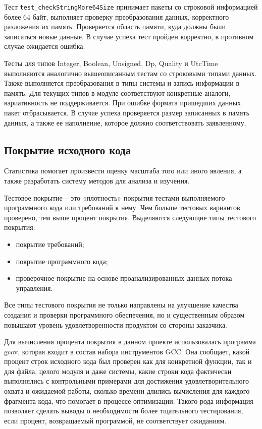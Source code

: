 Тест  \lstinline{test_checkStringMore64Size} принимает пакеты со строковой информацией более 64 байт, выполняет проверку преобразования данных, корректного разложения их память. Проверяется область памяти, куда должны были записаться новые данные. В случае успеха тест пройден корректно, в противном случае ожидается ошибка.

Тесты для типов Integer, Boolean, Unsigned,
Dp, Quality и UtcTime выполняются аналогично вышеописанным тестам со строковыми типами данных. Также выполняется преобразования в типы системы и запись информации в память. Для текущих типов в модуле соответствуют конкретные аналоги, вариативность не поддерживается. При ошибке формата пришедших данных пакет отбрасывается. В случае успеха проверяется размер записанных в память данных, а также ее наполнение, которое должно соответствовать заявленному.

\subsection{Покрытие исходного кода}

Статистика помогает произвести оценку масштаба того или иного явления, а также разработать систему методов для анализа и изучения.

Тестовое покрытие -- это «плотность» покрытия тестами выполняемого программного кода или требований к нему. Чем больше тестовых вариантов проверено, тем выше процент покрытия. Выделяются следующие типы тестового покрытия:

\begin{itemize}
    \item покрытие требований;
    \item покрытие программного кода;
    \item проверочное покрытие на основе проанализированных данных потока управления.
\end{itemize}

Все типы тестового покрытия не только направлены на улучшение качества создания и проверки программного обеспечения, но и существенным образом повышают уровень удовлетворенности продуктом со стороны заказчика.

Для вычисления процента покрытия в данном проекте использовалась программа gcov, которая входит в состав набора инструментов GCC. Она сообщает, какой процент
строк исходного кода был проверен как для конкретной функции, так и для файла, целого модуля и даже системы, какие строки кода фактически выполнялись с контрольными примерами для достижения удовлетворительного охвата и ожидаемой работы, сколько времени длились вычисления для каждого фрагмента кода, что помогает в процессе оптимизации. Такого рода информация позволяет сделать выводы о необходимости более тщательного тестирования, если процент, возвращаемый программой, не соответствует
ожиданиям.

